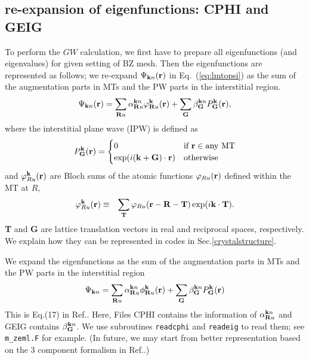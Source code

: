 \documentclass[a4paper,10pt,epsf,fleqn]{article}
\def\Psikn{\Psi_{{\bf k}n}}
\def\Psikn{{\Psi_{{\bf k}n}}}
\newcommand{\bfk}{{\bf k}}
\newcommand{\bfr}{{\bf r}}
\newcommand{\bfR}{{\bf R}}
\newcommand{\io}[1]{{\sf  #1}}
\newcommand{\req}[1]{\mbox{Eq.~(\ref{#1})}}
\begin{document}
\subsection{re-expansion of eigenfunctions: CPHI and GEIG}
To perform the $GW$ calculation, we first
have to prepare all eigenfunctions (and eigenvalues) for
given setting of BZ mesh. Then the eigenfunctions are
represented as follows; we
re-expand $\Psikn(\bfr)$ in \req{eq:lmtopsi}  
as the sum of the augmentation parts in MTs and the
PW parts in the interstitial region.
\begin{eqnarray}
\Psikn(\bfr)
= \sum_{\bfR u}  \alpha^{{\bfk}n}_{\bfR u} \varphi^{\bf k}_{\bfR u}({\bf r})
 + \sum_{\bf G}  \beta^{{\bfk}n}_{\bf G} P^{\bf k}_{\bf G}({\bf r}),
\label{def:psiexp}
\end{eqnarray}
where the interstitial plane wave (IPW) is defined as
\begin{eqnarray}
P^{\bf k}_{\bf G}({\bf r}) =
\begin{cases}
0    & \text{if {\bf r}} \in \text{any MT} \\
\exp(i ({\bf k+G})\cdot{\bf r})& \text{otherwise}
\end{cases}
\end{eqnarray}
and $\varphi^{\bf k}_{R u}(\bfr)$ are Bloch sums of the atomic functions
$\varphi_{R u}(\bfr)$ defined within the MT at $R$,
\begin{eqnarray}
\varphi^{\bf k}_{R u}({\bf r}) &\equiv& \sum_{\bf T} \varphi_{R u}({\bf r-R-T}) \exp(i {\bf k\cdot{}T}).
\end{eqnarray}
{\bf T} and {\bf G} are lattice translation vectors in real and reciprocal spaces, respectively. 
We explain how they can be represented in codes
in Sec.\ref{crystalstructure}.


We expand the eigenfunctions as the sum of the augmentation parts in MTs and the PW parts in the interstitial region
\begin{eqnarray}
\Psi_{{\bf k}n} = \sum_{{\bf R}u}\alpha_{{\bf R}u}^{{\bf k}n}\phi_{{\bf R}u}^{\bf k}({\bf r}) + \sum_{\bf G}\beta_{\bf G}^{{\bf k}n}P_{\bf G}^{\bf k}({\bf r})
\end{eqnarray}
This is Eq.(17) in Ref.\cite{kotani_quasiparticle_2014}.
Here, Files \io{CPHI} contains the information of $\alpha_{{\bf R}u}^{{\bf k}n}$ and \io{GEIG} contains $\beta_{\bf G}^{{\bf k}n}$. 
We use subroutines \verb#readcphi# and \verb#readeig# to
read them; see \verb#m_zeml.F# for example.
(In future, we may start from better representation
based on the 3 component formalism in Ref.\cite{kotani2015pmt}.)
\end{document}
